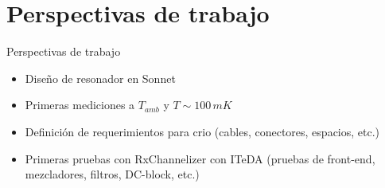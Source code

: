 \documentclass[ignorenonframetext,12pt]{beamer}
\begin{document}
\section{Perspectivas de trabajo}
\begin{frame}{Perspectivas de trabajo}
				\begin{itemize}
								\item Dise\~no de resonador en Sonnet
								\item Primeras mediciones a $T_{amb}$ y $T \sim 100\,mK$
								\item Definici\'on de requerimientos para crio (cables,
												conectores, espacios, etc.)
								\item Primeras pruebas con RxChannelizer con ITeDA (pruebas de
												front-end, mezcladores, filtros, DC-block, etc.)
				\end{itemize}
\end{frame}
\end{document}
